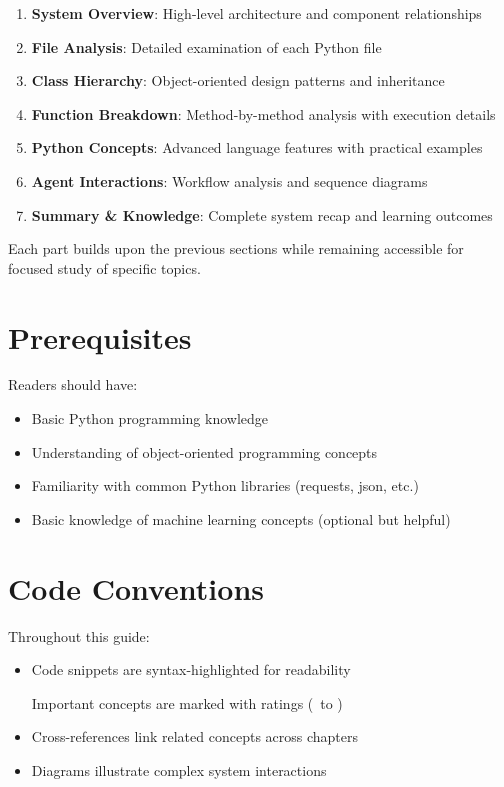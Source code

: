 \documentclass[12pt,twoside,openright]{book}
\newcommand{\starfull}{\ding{72}}   %
\newcommand{\starempty}{\ding{73}}  %
\begin{document}
\begin{enumerate}
    \item \textbf{System Overview}: High-level architecture and component relationships
    \item \textbf{File Analysis}: Detailed examination of each Python file
    \item \textbf{Class Hierarchy}: Object-oriented design patterns and inheritance
    \item \textbf{Function Breakdown}: Method-by-method analysis with execution details
    \item \textbf{Python Concepts}: Advanced language features with practical examples
    \item \textbf{Agent Interactions}: Workflow analysis and sequence diagrams
    \item \textbf{Summary \& Knowledge}: Complete system recap and learning outcomes
\end{enumerate}

Each part builds upon the previous sections while remaining accessible for focused study of specific topics.

\section*{Prerequisites}

Readers should have:
\begin{itemize}
    \item Basic Python programming knowledge
    \item Understanding of object-oriented programming concepts
    \item Familiarity with common Python libraries (requests, json, etc.)
    \item Basic knowledge of machine learning concepts (optional but helpful)
\end{itemize}

\section*{Code Conventions}

Throughout this guide:
\begin{itemize}
    \item Code snippets are syntax-highlighted for readability



Important concepts are marked with ratings (\starfull\starempty\starempty\starempty\starempty\ to \starfull\starfull\starfull\starfull\starfull)

    \item Cross-references link related concepts across chapters
    \item Diagrams illustrate complex system interactions
\end{itemize}
\end{document}
